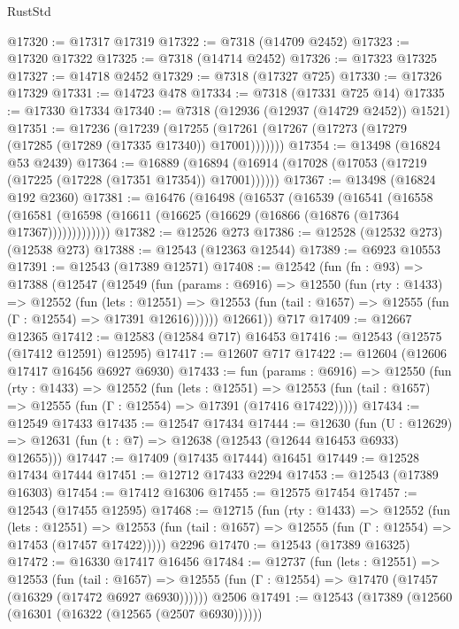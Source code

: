 \begin{lexlean}{RustStd}
\begin{coremodule}
@17320 := @17317 @17319
@17322 := @7318 (@14709 @2452)
@17323 := @17320 @17322
@17325 := @7318 (@14714 @2452)
@17326 := @17323 @17325
@17327 := @14718 @2452
@17329 := @7318 (@17327 @725)
@17330 := @17326 @17329
@17331 := @14723 @478
@17334 := @7318 (@17331 @725 @14)
@17335 := @17330 @17334
@17340 := @7318 (@12936 (@12937 (@14729 @2452)) @1521)
@17351 := @17236
    (@17239 (@17255 (@17261 (@17267 (@17273 (@17279 (@17285 (@17289 (@17335 @17340)) @17001)))))))
@17354 := @13498 (@16824 @53 @2439)
@17364 := @16889
    (@16894 (@16914 (@17028 (@17053 (@17219 (@17225 (@17228 (@17351 @17354)) @17001))))))
@17367 := @13498 (@16824 @192 @2360)
@17381 := @16476
    (@16498
      (@16537
        (@16539
          (@16541
            (@16558
              (@16581 (@16598 (@16611 (@16625 (@16629 (@16866 (@16876 (@17364 @17367)))))))))))))
@17382 := @12526 @273
@17386 := @12528 (@12532 @273) (@12538 @273)
@17388 := @12543 (@12363 @12544)
@17389 := @6923 @10553
@17391 := @12543 (@17389 @12571)
@17408 := @12542
    (fun (fn : @93) =>
    @17388
      (@12547
        (@12549
          (fun (params : @6916) =>
          @12550
            (fun (rty : @1433) =>
            @12552
              (fun (lets : @12551) =>
              @12553 (fun (tail : @1657) => @12555 (fun (Γ : @12554) => @17391 @12616))))))
        @12661))
    @717
@17409 := @12667 @12365
@17412 := @12583 (@12584 @717) @16453
@17416 := @12543 (@12575 (@17412 @12591) @12595)
@17417 := @12607 @717
@17422 := @12604 (@12606 @17417 @16456 @6927 @6930)
@17433 := fun (params : @6916) =>
  @12550
    (fun (rty : @1433) =>
    @12552
      (fun (lets : @12551) =>
      @12553 (fun (tail : @1657) => @12555 (fun (Γ : @12554) => @17391 (@17416 @17422)))))
@17434 := @12549 @17433
@17435 := @12547 @17434
@17444 := @12630
    (fun (U : @12629) => @12631 (fun (t : @7) => @12638 (@12543 (@12644 @16453 @6933) @12655)))
@17447 := @17409 (@17435 @17444) @16451
@17449 := @12528 @17434 @17444
@17451 := @12712 @17433 @2294
@17453 := @12543 (@17389 @16303)
@17454 := @17412 @16306
@17455 := @12575 @17454
@17457 := @12543 (@17455 @12595)
@17468 := @12715
    (fun (rty : @1433) =>
    @12552
      (fun (lets : @12551) =>
      @12553 (fun (tail : @1657) => @12555 (fun (Γ : @12554) => @17453 (@17457 @17422)))))
    @2296
@17470 := @12543 (@17389 @16325)
@17472 := @16330 @17417 @16456
@17484 := @12737
    (fun (lets : @12551) =>
    @12553
      (fun (tail : @1657) =>
      @12555 (fun (Γ : @12554) => @17470 (@17457 (@16329 (@17472 @6927 @6930))))))
    @2506
@17491 := @12543 (@17389 (@12560 (@16301 (@16322 (@12565 (@2507 @6930))))))

\end{coremodule}
\end{lexlean}
